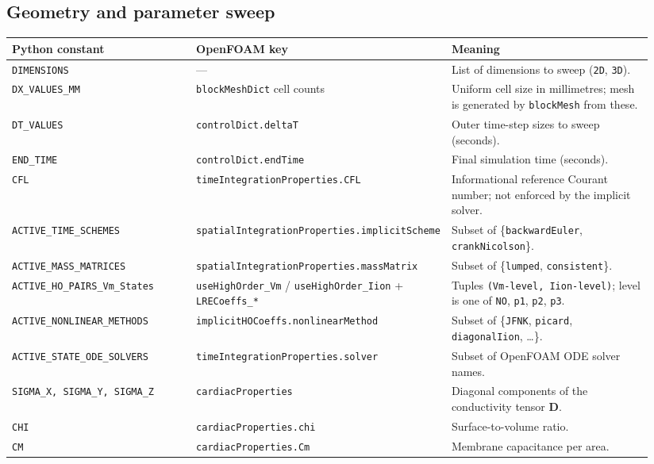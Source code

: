 \documentclass[11pt,a4paper]{article}
\newcommand{\Dten}{\mathbf{D}}
\newcommand{\code}[1]{\texttt{\small #1}}
\begin{document}
\subsection{Geometry and parameter sweep}
\begin{longtable}{@{}p{0.30\linewidth}p{0.28\linewidth}p{0.36\linewidth}@{}}
\toprule
Python constant & OpenFOAM key & Meaning \\
\midrule \endhead
\code{DIMENSIONS} & --- &
   List of dimensions to sweep (\code{2D}, \code{3D}). \\
\code{DX\_VALUES\_MM} & \code{blockMeshDict} cell counts &
   Uniform cell size in millimetres; mesh is generated by
   \code{blockMesh} from these. \\
\code{DT\_VALUES} & \code{controlDict.deltaT} &
   Outer time-step sizes to sweep (seconds). \\
\code{END\_TIME} & \code{controlDict.endTime} &
   Final simulation time (seconds). \\
\code{CFL} & \code{timeIntegrationProperties.CFL} &
   Informational reference Courant number; not enforced by
   the implicit solver. \\
\code{ACTIVE\_TIME\_SCHEMES} &
   \code{spatialIntegrationProperties.implicitScheme} &
   Subset of \{\code{backwardEuler}, \code{crankNicolson}\}. \\
\code{ACTIVE\_MASS\_MATRICES} &
   \code{spatialIntegrationProperties.massMatrix} &
   Subset of \{\code{lumped}, \code{consistent}\}. \\
\code{ACTIVE\_HO\_PAIRS\_Vm\_States} &
   \code{useHighOrder\_Vm} / \code{useHighOrder\_Iion}
   + \code{LRECoeffs\_*} & Tuples
   \texttt{(Vm-level, Iion-level)}; level is one of
   \code{NO}, \code{p1}, \code{p2}, \code{p3}. \\
\code{ACTIVE\_NONLINEAR\_METHODS} &
   \code{implicitHOCoeffs.nonlinearMethod} &
   Subset of \{\code{JFNK}, \code{picard}, \code{diagonalIion}, \dots\}. \\
\code{ACTIVE\_STATE\_ODE\_SOLVERS} &
   \code{timeIntegrationProperties.solver} &
   Subset of OpenFOAM ODE solver names. \\
\code{SIGMA\_X, SIGMA\_Y, SIGMA\_Z} & \code{cardiacProperties} &
   Diagonal components of the conductivity tensor $\Dten$. \\
\code{CHI} & \code{cardiacProperties.chi} & Surface-to-volume ratio. \\
\code{CM} & \code{cardiacProperties.Cm} & Membrane capacitance per area. \\
\bottomrule
\end{longtable}
\end{document}
